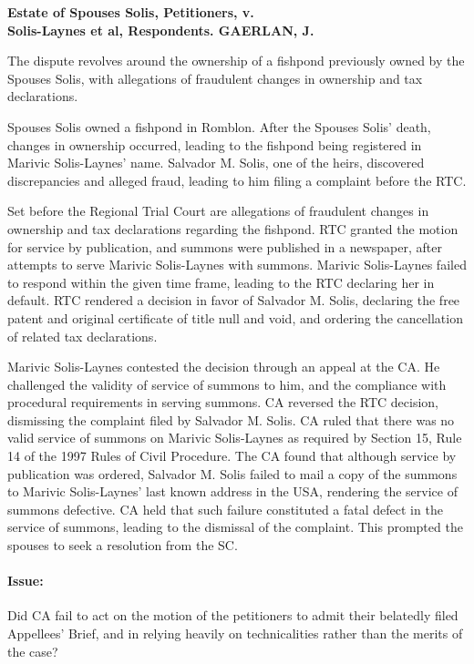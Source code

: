 \documentclass[
12pt,
oneside,
onehalfspacing,
headsepline
]{DigestCollection}
\begin{document}

\noindent\textbf{Estate of Spouses Solis, Petitioners, v. \\Solis-Laynes et al, Respondents. GAERLAN, J.}\vspace{0.4cm}

The dispute revolves around the ownership of a fishpond previously owned by the Spouses Solis, with allegations of fraudulent changes in ownership and tax declarations.

Spouses Solis owned a fishpond in Romblon. After the Spouses Solis' death, changes in ownership occurred, leading to the fishpond being registered in Marivic Solis-Laynes' name. Salvador M. Solis, one of the heirs, discovered discrepancies and alleged fraud, leading to him filing a complaint before the RTC.

Set before the Regional Trial Court are allegations of fraudulent changes in ownership and tax declarations regarding the fishpond. RTC granted the motion for service by publication, and summons were published in a newspaper, after attempts to serve Marivic Solis-Laynes with summons. Marivic Solis-Laynes failed to respond within the given time frame, leading to the RTC declaring her in default. RTC rendered a decision in favor of Salvador M. Solis, declaring the free patent and original certificate of title null and void, and ordering the cancellation of related tax declarations.

Marivic Solis-Laynes contested the decision through an appeal at the CA. He challenged the validity of service of summons to him, and the compliance with procedural requirements in serving summons. CA reversed the RTC decision, dismissing the complaint filed by Salvador M. Solis. CA ruled that there was no valid service of summons on Marivic Solis-Laynes as required by Section 15, Rule 14 of the 1997 Rules of Civil Procedure. The CA found that although service by publication was ordered, Salvador M. Solis failed to mail a copy of the summons to Marivic Solis-Laynes' last known address in the USA, rendering the service of summons defective. CA held that such failure constituted a fatal defect in the service of summons, leading to the dismissal of the complaint. This prompted the spouses to seek a resolution from the SC.

\paragraph{Issue:}


Did CA fail to act on the motion of the petitioners to admit their belatedly filed Appellees' Brief, and in relying heavily on technicalities rather than the merits of the case?
\end{document}
